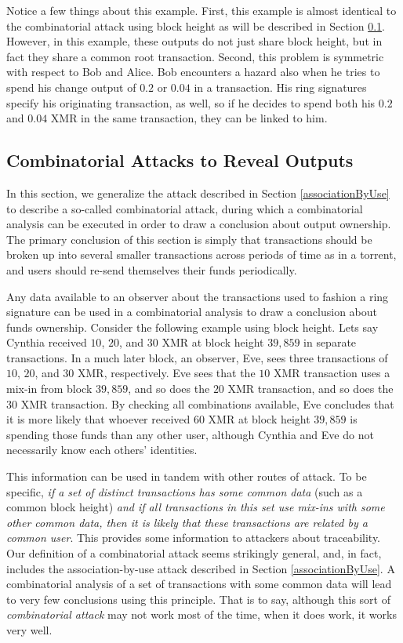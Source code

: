 \documentclass[12pt,english]{mrl}
\theoremstyle{definition}
\numberwithin{equation}{section}
\numberwithin{figure}{section}
\numberwithin{equation}{section}
\numberwithin{equation}{section}
\numberwithin{figure}{section}
\begin{document}
Notice a few things about this example. First, this example is almost identical to the combinatorial attack using block height as will be described in Section \ref{combinationAttacks}. However, in this example, these outputs do not just share block height, but in fact they share a common root transaction. Second, this problem is symmetric with respect to Bob and Alice. Bob encounters a hazard also when he tries to spend his change output of $0.2$ or $0.04$ in a transaction. His ring signatures specify his originating transaction, as well, so if he decides to spend both his $0.2$ and $0.04$ XMR in the same transaction, they can be linked to him. 

\subsection{Combinatorial Attacks to Reveal Outputs}\label{combinationAttacks}

In this section, we generalize the attack described in Section \ref{associationByUse} to describe a so-called combinatorial attack, during which a combinatorial analysis can be executed in order to draw a conclusion about output ownership. The primary conclusion of this section is simply that transactions should be broken up into several smaller transactions across periods of time as in a torrent, and users should re-send themselves their funds periodically. 

Any data available to an observer about the transactions used to fashion a ring signature can be used in a combinatorial analysis to draw a conclusion about funds ownership. Consider the following example using block height. Lets say Cynthia received $10$, $20$, and $30$ XMR at block height $39,859$ in separate transactions. In a much later block, an observer, Eve, sees three transactions of $10$, $20$, and $30$ XMR, respectively. Eve sees that the $10$ XMR transaction uses a mix-in from block $39,859$, and so does the $20$ XMR transaction, and so does the $30$ XMR transaction. By checking all combinations available, Eve concludes that it is more likely that whoever received $60$ XMR at block height $39,859$ is spending those funds than any other user, although Cynthia and Eve do not necessarily know each others' identities. 

This information can be used in tandem with other routes of attack. To be specific, \textit{if a set of distinct transactions has some common data} (such as a common block height) \textit{and if all transactions in this set use mix-ins with some other common data, then it is likely that these transactions are related by a common user}.  This provides some information to attackers about traceability. Our definition of a combinatorial attack seems strikingly general, and, in fact, includes the association-by-use attack described in Section \ref{associationByUse}. A combinatorial analysis of a set of transactions with some common data will lead to very few conclusions using this principle. That is to say, although this sort of \textit{combinatorial attack} may not work most of the time, when it does work, it works very well. 
\end{document}
